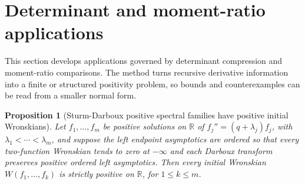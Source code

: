 \documentclass[11pt]{article}
\numberwithin{equation}{section}
\newtheorem{proposition}[theorem]{Proposition}
\theoremstyle{definition}
\theoremstyle{remark}
\newcommand{\1}{\mathbf 1}
\begin{document}
\section{Determinant and moment-ratio applications}
\label{sec:determinant-and-moment-ratio-applications}
This section develops applications governed by determinant compression and moment-ratio comparisons.  The method turns recursive derivative information into a finite or structured positivity problem, so bounds and counterexamples can be read from a smaller normal form.

\begin{proposition}[Sturm-Darboux positive spectral families have positive initial Wronskians]
\label{res:sturmdarboux-positivespectralfamily-wronskians}
Let \(f_1,\ldots,f_m\) be positive solutions on \(\mathbb R\) of \(f_j''=(q+\lambda_j)f_j\), with \(\lambda_1<\cdots<\lambda_m\), and suppose the left endpoint asymptotics are ordered so that every two-function Wronskian tends to zero at \(-\infty\) and each Darboux transform preserves positive ordered left asymptotics. Then every initial Wronskian \(W(f_1,\ldots,f_k)\) is strictly positive on \(\mathbb R\), for \(1\le k\le m\).
\end{proposition}
\end{document}
